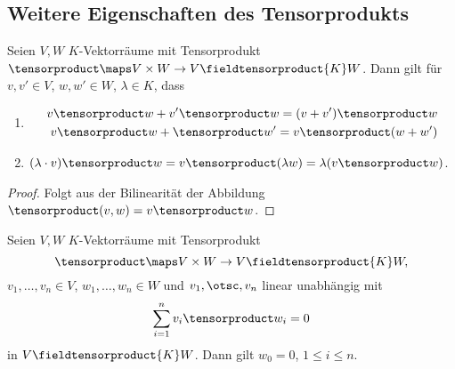 \subsection*{Weitere Eigenschaften des Tensorprodukts}
\begin{lemma}
  Seien \( V,W \) \( K \)-Vektorräume mit Tensorprodukt \( \tensorproduct\maps V\times W\to V\fieldtensorproduct{K}W \). Dann gilt für \( v,v'\in V \), \( w,w'\in W \), \( \lambda\in K \), dass 
  \begin{enumerate}
    \item \label{tensorprodukt:distributiv}
    \begin{align*}
      v\tensorproduct w+v'\tensorproduct w=(v+v')\tensorproduct w\\
      v\tensorproduct w+\tensorproduct w'=v\tensorproduct (w+w')
    \end{align*}
    \item \( (\lambda\cdot v)\tensorproduct w=v\tensorproduct (\lambda w)=\lambda (v \tensorproduct w) \).
  \end{enumerate}
\end{lemma}
\begin{proof}
  Folgt aus der Bilinearität der Abbildung \( \tensorproduct(v,w)=v\tensorproduct w \).
\end{proof}
\begin{lemma}
  Seien \( V,W \) \( K \)-Vektorräume mit Tensorprodukt
  \begin{equation*}
    \tensorproduct\maps V\times W\to V\fieldtensorproduct{K} W,
  \end{equation*}
  \( v_1,\dotsc,v_n\in V \), \( w_1,\dotsc,w_n\in W \) und \( v_1,\otsc,v_n \) linear unabhängig mit
  \begin{equation*}
    \sum_{i=1}^{n}v_i\tensorproduct w_i=0
  \end{equation*}
  in \( V\fieldtensorproduct{K}W \). Dann gilt \( w_0=0 \), \( 1\leq i\leq n \).
\end{lemma}

